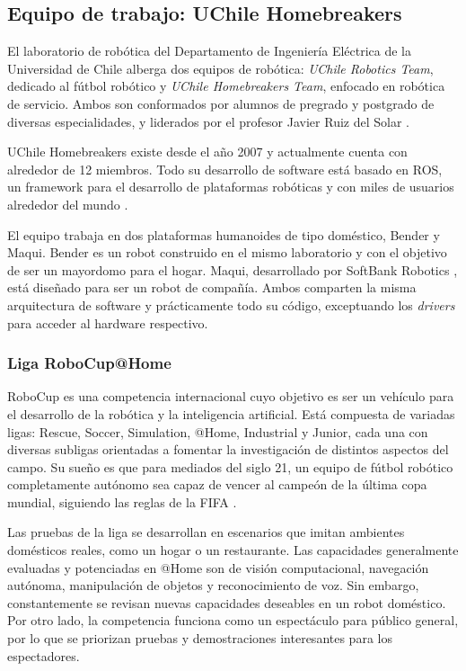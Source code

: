 \subsection{Equipo de trabajo: UChile Homebreakers}


El laboratorio de robótica del Departamento de Ingeniería Eléctrica de la Universidad de Chile alberga dos equipos de robótica: \textit{UChile Robotics Team}, dedicado al fútbol robótico y \textit{UChile Homebreakers Team}, enfocado en robótica de servicio. Ambos son conformados por alumnos de pregrado y postgrado de diversas especialidades, y liderados por el profesor Javier Ruiz del Solar \cite{uchile-robotics}.

UChile Homebreakers existe desde el año 2007 y actualmente cuenta con alrededor de 12 miembros. Todo su desarrollo de software está basado en ROS, un framework para el desarrollo de plataformas robóticas y con miles de usuarios alrededor del mundo \cite{ROS:2009}.

El equipo trabaja en dos plataformas humanoides de tipo doméstico, Bender y Maqui. Bender es un robot construido en el mismo laboratorio y con el objetivo de ser un mayordomo para el hogar. Maqui, desarrollado por SoftBank Robotics \cite{softbank}, está diseñado para ser un robot de compañía. Ambos comparten la misma arquitectura de software y prácticamente todo su código, exceptuando los \textit{drivers} para acceder al hardware respectivo.

\subsubsection{Liga RoboCup@Home}

RoboCup es una competencia internacional cuyo objetivo es ser un vehículo para el desarrollo de la robótica y la inteligencia artificial. Está compuesta de variadas ligas: Rescue, Soccer, Simulation, @Home, Industrial y Junior, cada una con diversas subligas orientadas a fomentar la investigación de distintos aspectos del campo. Su sueño es que para mediados del siglo 21, un equipo de fútbol robótico completamente autónomo sea capaz de vencer al campeón de la última copa mundial, siguiendo las reglas de la FIFA \cite{robocup:rulebook_2018}.

Las pruebas de la liga se desarrollan en escenarios que imitan ambientes domésticos reales, como un hogar o un restaurante. Las capacidades generalmente evaluadas y potenciadas en @Home son de visión computacional, navegación autónoma, manipulación de objetos y reconocimiento de voz. Sin embargo, constantemente se revisan nuevas capacidades deseables en un robot doméstico. Por otro lado, la competencia funciona como un espectáculo para público general, por lo que se priorizan pruebas y demostraciones interesantes para los espectadores.

